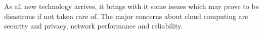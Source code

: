 



As all new technology arrives, it brings with it some issues which may prove to be disastrous if not taken care of. The major concerns about cloud computing are security and privacy, network performance and reliability.



